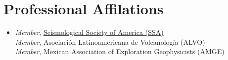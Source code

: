 \documentclass[letterpaper,11pt]{article}
\begin{document}
%
\section{Professional Affilations}
 \begin{itemize}[leftmargin=0, label={}]
    \item{
     \textit{Member}{, \href{https://www.seismosoc.org/}{Seismological Society of America (SSA)} } \\
     \textit{Member}{, Asociación Latinoamericana de Volcanología (ALVO)}  \\
     \textit{Member}{, Mexican Association of Exploration Geophysicists (AMGE)}  \\
    }
 \end{itemize}
 \vspace{-16pt}
\end{document}
